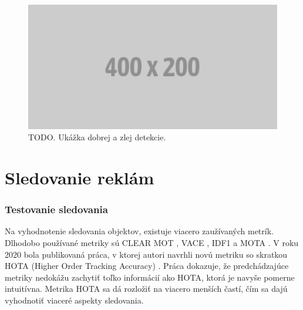 \\
\begin{figure}[ht]
    \centering
    \includegraphics[width=1\textwidth]{images/placeholder.png}
    \caption{TODO. Ukážka dobrej a zlej detekcie.}
    \label{img:lab}
\end{figure}

\section{Sledovanie reklám}


\subsubsection{Testovanie sledovania}

Na vyhodnotenie sledovania objektov, existuje viacero zaužívaných metrík. Dlhodobo používané metriky sú CLEAR MOT \cite{clear}, VACE \cite{vace}, IDF1 \cite{idf} a MOTA \cite{mota}. V roku 2020 bola publikovaná práca, v ktorej autori navrhli novú metriku so skratkou HOTA (Higher Order Tracking Accuracy) \cite{hota}. Práca dokazuje, že predchádzajúce metriky nedokážu zachytiť toľko informácií ako HOTA, ktorá je navyše pomerne intuitívna. Metrika HOTA sa dá rozložiť na viacero menších častí, čím sa dajú vyhodnotiť viaceré aspekty sledovania.

